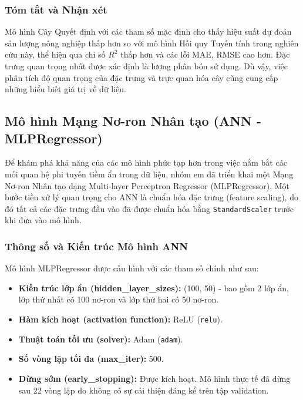 \subsubsection{Tóm tắt và Nhận xét}
Mô hình Cây Quyết định với các tham số mặc định cho thấy hiệu suất dự đoán sản lượng nông nghiệp thấp hơn so với mô hình Hồi quy Tuyến tính trong nghiên cứu này, thể hiện qua chỉ số $R^2$ thấp hơn và các lỗi MAE, RMSE cao hơn. Đặc trưng quan trọng nhất được xác định là lượng phân bón sử dụng.
Dù vậy, việc phân tích độ quan trọng của đặc trưng và trực quan hóa cây cũng cung cấp những hiểu biết giá trị về dữ liệu.








\subsection{ Mô hình Mạng Nơ-ron Nhân tạo (ANN - MLPRegressor)}
\label{subsec:ann_results}

Để khám phá khả năng của các mô hình phức tạp hơn trong việc nắm bắt các mối quan hệ phi tuyến tiềm ẩn trong dữ liệu, nhóm em đã triển khai một Mạng Nơ-ron Nhân tạo dạng Multi-layer Perceptron Regressor (MLPRegressor). Một bước tiền xử lý quan trọng cho ANN là chuẩn hóa đặc trưng (feature scaling), do đó tất cả các đặc trưng đầu vào đã được chuẩn hóa bằng \texttt{StandardScaler} trước khi đưa vào mô hình. 

\subsubsection{Thông số và Kiến trúc Mô hình ANN}
\label{subsubsec:ann_architecture_metrics}

Mô hình MLPRegressor được cấu hình với các tham số chính như sau:
\begin{itemize}
    \item \textbf{Kiến trúc lớp ẩn (hidden\_layer\_sizes):} (100, 50) - bao gồm 2 lớp ẩn, lớp thứ nhất có 100 nơ-ron và lớp thứ hai có 50 nơ-ron.
    \item \textbf{Hàm kích hoạt (activation function):} ReLU (\texttt{relu}).
    \item \textbf{Thuật toán tối ưu (solver):} Adam (\texttt{adam}).
    \item \textbf{Số vòng lặp tối đa (max\_iter):} 500.
    \item \textbf{Dừng sớm (early\_stopping):} Được kích hoạt. Mô hình thực tế đã dừng sau 22 vòng lặp do không có sự cải thiện đáng kể trên tập validation.
\end{itemize}


